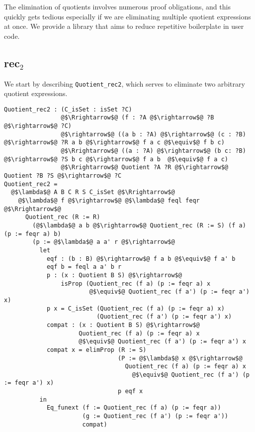 \documentclass[12pt,twoside,maitrise]{dms}
\theoremstyle{definition}
\numberwithin{equation}{section}
\numberwithin{table}{chapter}
\numberwithin{figure}{chapter}
\newcommand\id[1] {\texttt{#1}}
\begin{document}
The elimination of quotients involves numerous proof obligations, and this
quickly gets tedious especially if we are eliminating multiple quotient
expressions at once. We provide a library that aims to reduce repetitive
boilerplate in user code.

\subsection*{rec$_2$}\label{sec:rec2}
We start by describing \id{Quotient\_rec2}, which serves to eliminate two arbitrary quotient expressions.

\begin{verbatim}
Quotient_rec2 : (C_isSet : isSet ?C)
                @$\Rrightarrow$@ (f : ?A @$\rightarrow$@ ?B @$\rightarrow$@ ?C)
                @$\rightarrow$@ ((a b : ?A) @$\rightarrow$@ (c : ?B) @$\rightarrow$@ ?R a b @$\rightarrow$@ f a c @$\equiv$@ f b c)
                @$\Rrightarrow$@ ((a : ?A) @$\rightarrow$@ (b c: ?B) @$\rightarrow$@ ?S b c @$\rightarrow$@ f a b  @$\equiv$@ f a c)
                @$\Rrightarrow$@ Quotient ?A ?R @$\rightarrow$@ Quotient ?B ?S @$\rightarrow$@ ?C
Quotient_rec2 =
  @$\lambda$@ A B C R S C_isSet @$\Rrightarrow$@
    @$\lambda$@ f @$\rightarrow$@ @$\lambda$@ feql feqr @$\Rrightarrow$@
      Quotient_rec (R := R)
        (@$\lambda$@ a b @$\rightarrow$@ Quotient_rec (R := S) (f a) (p := feqr a) b)
        (p := @$\lambda$@ a a' r @$\rightarrow$@
          let
            eqf : (b : B) @$\rightarrow$@ f a b @$\equiv$@ f a' b
            eqf b = feql a a' b r
            p : (x : Quotient B S) @$\rightarrow$@
                isProp (Quotient_rec (f a) (p := feqr a) x
                        @$\equiv$@ Quotient_rec (f a') (p := feqr a') x)
            p x = C_isSet (Quotient_rec (f a) (p := feqr a) x)
                          (Quotient_rec (f a') (p := feqr a') x)
            compat : (x : Quotient B S) @$\rightarrow$@
                     Quotient_rec (f a) (p := feqr a) x
                     @$\equiv$@ Quotient_rec (f a') (p := feqr a') x
            compat x = elimProp (R := S)
                                (P := @$\lambda$@ x @$\rightarrow$@
                                  Quotient_rec (f a) (p := feqr a) x
                                    @$\equiv$@ Quotient_rec (f a') (p := feqr a') x)
                                p eqf x
          in
            Eq_funext (f := Quotient_rec (f a) (p := feqr a))
                      (g := Quotient_rec (f a') (p := feqr a'))
                      compat)
\end{verbatim}
\end{document}
